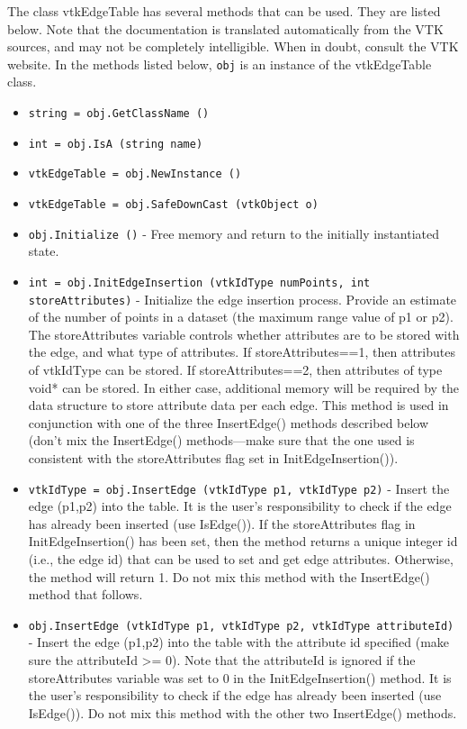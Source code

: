 The class vtkEdgeTable has several methods that can be used.
  They are listed below.
Note that the documentation is translated automatically from the VTK sources,
and may not be completely intelligible.  When in doubt, consult the VTK website.
In the methods listed below, \verb|obj| is an instance of the vtkEdgeTable class.
\begin{itemize}
\item  \verb|string = obj.GetClassName ()|

\item  \verb|int = obj.IsA (string name)|

\item  \verb|vtkEdgeTable = obj.NewInstance ()|

\item  \verb|vtkEdgeTable = obj.SafeDownCast (vtkObject o)|

\item  \verb|obj.Initialize ()| -  Free memory and return to the initially instantiated state.

\item  \verb|int = obj.InitEdgeInsertion (vtkIdType numPoints, int storeAttributes)| -  Initialize the edge insertion process. Provide an estimate of the number
 of points in a dataset (the maximum range value of p1 or p2).  The
 storeAttributes variable controls whether attributes are to be stored
 with the edge, and what type of attributes. If storeAttributes==1, then
 attributes of vtkIdType can be stored. If storeAttributes==2, then
 attributes of type void* can be stored. In either case, additional
 memory will be required by the data structure to store attribute data
 per each edge.  This method is used in conjunction with one of the three
 InsertEdge() methods described below (don't mix the InsertEdge()
 methods---make sure that the one used is consistent with the
 storeAttributes flag set in InitEdgeInsertion()).

\item  \verb|vtkIdType = obj.InsertEdge (vtkIdType p1, vtkIdType p2)| -  Insert the edge (p1,p2) into the table. It is the user's
 responsibility to check if the edge has already been inserted
 (use IsEdge()). If the storeAttributes flag in InitEdgeInsertion()
 has been set, then the method returns a unique integer id (i.e.,
 the edge id) that can be used to set and get edge
 attributes. Otherwise, the method will return 1. Do not mix this
 method with the InsertEdge() method that follows.

\item  \verb|obj.InsertEdge (vtkIdType p1, vtkIdType p2, vtkIdType attributeId)| -  Insert the edge (p1,p2) into the table with the attribute id
 specified (make sure the attributeId >= 0). Note that the
 attributeId is ignored if the storeAttributes variable was set to
 0 in the InitEdgeInsertion() method. It is the user's
 responsibility to check if the edge has already been inserted
 (use IsEdge()). Do not mix this method with the other two
 InsertEdge() methods.


\end{itemize}
